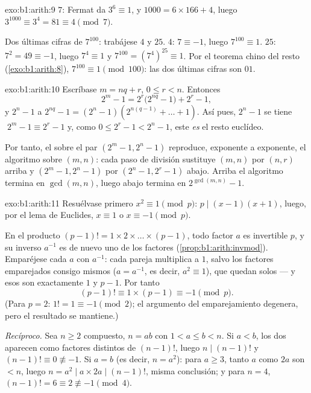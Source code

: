 \begin{solution}{exo:b1:arith:9}
 $7$: Fermat da $3^6 \equiv 1$, y $1000 = 6 \times 166 + 4$,
luego $3^{1000} \equiv 3^4 = 81 \equiv 4 \pmod 7$.

Dos últimas cifras de $7^{100}$: trabájese  $4$ y  $25$.
 $4$: $7 \equiv -1$, luego $7^{100} \equiv 1$.  $25$:
$7^2 = 49 \equiv -1$, luego $7^4 \equiv 1$ y
$7^{100} = (7^4)^{25} \equiv 1$. Por el teorema chino del resto
(\cref{exo:b1:arith:8}), $7^{100} \equiv 1 \pmod{100}$: las dos
últimas cifras son $01$.
\end{solution}

\begin{solution}{exo:b1:arith:10}
Escríbase $m = nq + r$, $0 \leq r < n$. Entonces
\[
2^m - 1 = 2^r\bigl(2^{nq} - 1\bigr) + 2^r - 1,
\]
y $2^n - 1$  a $2^{nq} - 1 = (2^n - 1)(2^{n(q-1)} + \dots +
1)$. Así pues,  $2^n - 1$ se tiene $\;2^m - 1 \equiv 2^r - 1$ y,
como $0 \leq 2^r - 1 < 2^n - 1$, este \emph{es} el resto euclídeo.

Por tanto, el  sobre el par $(2^m - 1, 2^n - 1)$
reproduce, exponente a exponente, el algoritmo sobre $(m, n)$: cada
paso de división sustituye $(m, n)$ por $(n, r)$ arriba y
$(2^m - 1, 2^n - 1)$ por $(2^n - 1, 2^r - 1)$ abajo. Arriba el
algoritmo termina en $\gcd(m,n)$, luego abajo termina en
$2^{\gcd(m,n)} - 1$.
\end{solution}

\begin{solution}{exo:b1:arith:11}
Resuélvase primero $x^2 \equiv 1 \pmod p$: $p \mid (x-1)(x+1)$, luego,
por el lema de Euclides, $x \equiv 1$ o $x \equiv -1 \pmod p$.

En el producto $(p-1)! = 1 \times 2 \times \dots \times (p-1)$, todo
factor $a$ es invertible  $p$, y su inverso $a^{-1}$ es de nuevo
uno de los factores (\cref{prop:b1:arith:invmod}). Emparéjese cada $a$
con $a^{-1}$: cada pareja multiplica a $1$, salvo los factores
emparejados consigo mismos ($a = a^{-1}$, es decir, $a^2 \equiv 1$),
que quedan solos --- y esos son exactamente $1$ y $p - 1$. Por tanto
\[
(p-1)! \equiv 1 \times (p - 1) \equiv -1 \pmod p .
\]
(Para $p = 2$: $1! = 1 \equiv -1 \pmod 2$; el argumento del
emparejamiento degenera, pero el resultado se mantiene.)

\emph{Recíproco.} Sea $n \geq 2$ compuesto, $n = ab$ con
$1 < a \leq b < n$. Si $a < b$, los dos aparecen como factores
distintos de $(n-1)!$, luego $n \mid (n-1)!$ y
$(n-1)! \equiv 0 \not\equiv -1$. Si $a = b$ (es decir, $n = a^2$):
para $a \geq 3$, tanto $a$ como $2a$ son $< n$, luego
$n = a^2 \mid a \times 2a \mid (n-1)!$, misma conclusión; y para
$n = 4$, $(n-1)! = 6 \equiv 2 \not\equiv -1 \pmod 4$.
\end{solution}

